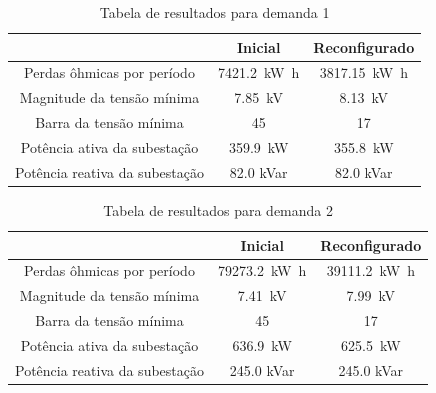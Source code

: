 \begin{table}[H]
    \centering
    \caption{Tabela de resultados para demanda 1}
    \begin{tabular}{|c|c|c|}
    \hline
                                   & Inicial              & Reconfigurado               \\\hline
    Perdas ôhmicas por período       & \SI{7421.2}{\kilo\watt\hour}      & \SI{3817.15}{\kilo\watt\hour}  \\\hline
    Magnitude da tensão mínima     & \SI{7.85}{\kilo\volt}    & \SI{8.13}{\kilo\volt}   \\\hline
    Barra da tensão mínima         & 45                       & 17                      \\\hline
    Potência ativa da subestação   & \SI{359.9}{\kilo\watt} & \SI{355.8}{\kilo\watt}\\\hline
    Potência reativa da subestação & 82.0 kVar              & 82.0 kVar      \\\hline
    \end{tabular}
    \label{tab:45rand1}
\end{table}

\begin{table}[H]
    \centering
    \caption{Tabela de resultados para demanda 2}
    \begin{tabular}{|c|c|c|}
    \hline
                                   & Inicial              & Reconfigurado               \\\hline
    Perdas ôhmicas por período       & \SI{79273.2}{\kilo\watt\hour}      & \SI{39111.2}{\kilo\watt\hour}  \\\hline
    Magnitude da tensão mínima     & \SI{7.41}{\kilo\volt}    & \SI{7.99}{\kilo\volt}   \\\hline
    Barra da tensão mínima         & 45                       & 17                      \\\hline
    Potência ativa da subestação   & \SI{636.9}{\kilo\watt} & \SI{625.5}{\kilo\watt}\\\hline
    Potência reativa da subestação & 245.0 kVar              & 245.0 kVar      \\\hline
    \end{tabular}
    \label{tab:45rand2}
\end{table}


